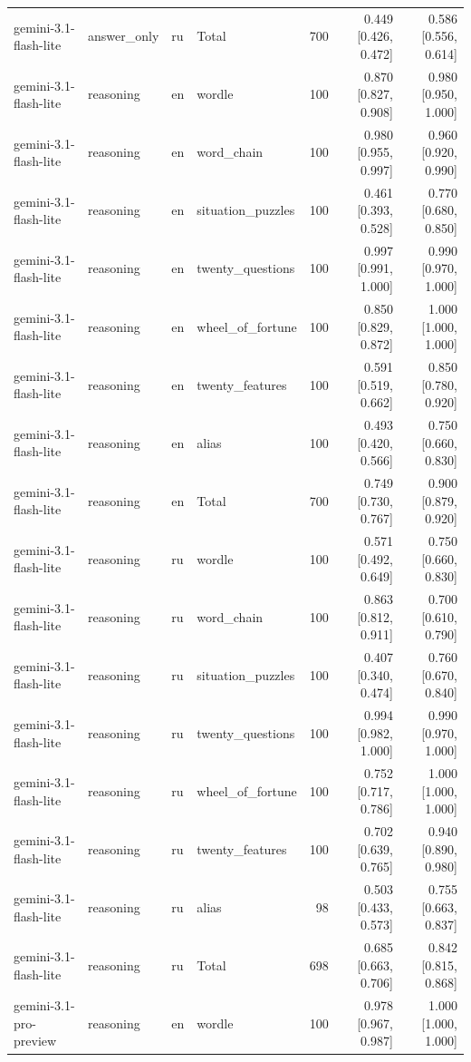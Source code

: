 \begin{longtable}{llllrrr}
gemini-3.1-flash-lite & answer\_only & ru & Total & 700 & 0.449 [0.426, 0.472] & 0.586 [0.556, 0.614] \\
gemini-3.1-flash-lite & reasoning & en & wordle & 100 & 0.870 [0.827, 0.908] & 0.980 [0.950, 1.000] \\
gemini-3.1-flash-lite & reasoning & en & word\_chain & 100 & 0.980 [0.955, 0.997] & 0.960 [0.920, 0.990] \\
gemini-3.1-flash-lite & reasoning & en & situation\_puzzles & 100 & 0.461 [0.393, 0.528] & 0.770 [0.680, 0.850] \\
gemini-3.1-flash-lite & reasoning & en & twenty\_questions & 100 & 0.997 [0.991, 1.000] & 0.990 [0.970, 1.000] \\
gemini-3.1-flash-lite & reasoning & en & wheel\_of\_fortune & 100 & 0.850 [0.829, 0.872] & 1.000 [1.000, 1.000] \\
gemini-3.1-flash-lite & reasoning & en & twenty\_features & 100 & 0.591 [0.519, 0.662] & 0.850 [0.780, 0.920] \\
gemini-3.1-flash-lite & reasoning & en & alias & 100 & 0.493 [0.420, 0.566] & 0.750 [0.660, 0.830] \\
gemini-3.1-flash-lite & reasoning & en & Total & 700 & 0.749 [0.730, 0.767] & 0.900 [0.879, 0.920] \\
gemini-3.1-flash-lite & reasoning & ru & wordle & 100 & 0.571 [0.492, 0.649] & 0.750 [0.660, 0.830] \\
gemini-3.1-flash-lite & reasoning & ru & word\_chain & 100 & 0.863 [0.812, 0.911] & 0.700 [0.610, 0.790] \\
gemini-3.1-flash-lite & reasoning & ru & situation\_puzzles & 100 & 0.407 [0.340, 0.474] & 0.760 [0.670, 0.840] \\
gemini-3.1-flash-lite & reasoning & ru & twenty\_questions & 100 & 0.994 [0.982, 1.000] & 0.990 [0.970, 1.000] \\
gemini-3.1-flash-lite & reasoning & ru & wheel\_of\_fortune & 100 & 0.752 [0.717, 0.786] & 1.000 [1.000, 1.000] \\
gemini-3.1-flash-lite & reasoning & ru & twenty\_features & 100 & 0.702 [0.639, 0.765] & 0.940 [0.890, 0.980] \\
gemini-3.1-flash-lite & reasoning & ru & alias & 98 & 0.503 [0.433, 0.573] & 0.755 [0.663, 0.837] \\
gemini-3.1-flash-lite & reasoning & ru & Total & 698 & 0.685 [0.663, 0.706] & 0.842 [0.815, 0.868] \\
gemini-3.1-pro-preview & reasoning & en & wordle & 100 & 0.978 [0.967, 0.987] & 1.000 [1.000, 1.000] \\

\end{longtable}
